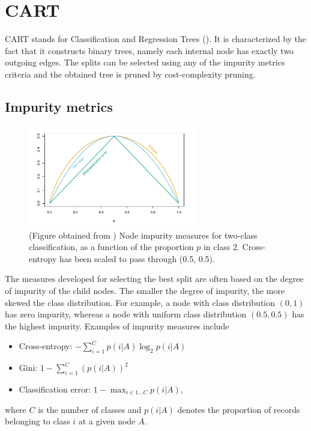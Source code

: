 \section{CART} %
\label{sec:cart}
CART stands for Classification and Regression Trees (\cite{breiman1984cart}). It
is characterized by the fact that it constructs binary trees, namely each
internal node has exactly two outgoing edges. The splits can be selected using
any of the impurity metrics criteria and the obtained tree is pruned by
cost-complexity pruning.

\subsection{Impurity metrics} %
\label{sub:impurity_metrics}
\begin{figure}[h!tb]
    \begin{center}
        \includegraphics[width=0.65\textwidth]{figures/impurity_measures}
    \end{center}
    \caption{(Figure obtained from \cite{hastie2008statisticallearning})
Node impurity measures for two-class classification, as a function of the
proportion $p$ in class 2. Cross-entropy has been scaled to pass through (0.5, 0.5).}
    \label{fig:impurity_measures}
\end{figure}

The measures developed for selecting the best split are often based on the
degree of impurity of the child nodes. The smaller the degree of impurity,
the more skewed the class distribution.  For example, a node with class
distribution $(0, 1)$ has zero impurity, whereas a node with uniform class
distribution $(0.5, 0.5)$ has the highest impurity. Examples of impurity
measures include

\begin{itemize}
    \item Cross-entropy: $- \displaystyle \sum_{i=1}^{C}p(i|A)\log_2 p(i|A)$
    \item Gini: $1 - \displaystyle \sum_{i=1}^{C} \left(p(i|A)\right)^2$
    \item Classification error: $1 - \displaystyle \max_{i \in 1\ldots C} p(i|A)$,
\end{itemize}
where $C$ is the number of classes and $p(i|A)$ denotes the proportion of records
belonging to class $i$ at a given node $A$.

